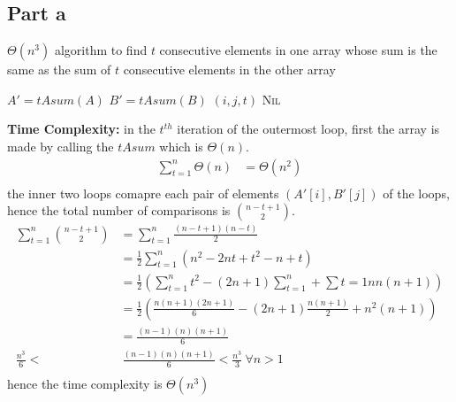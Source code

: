 \documentclass[12pt]{article}
\begin{document}
\subsection*{Part a}
\begin{algorithm}[H]
    \caption{$\varTheta(n^3)$ algorithm to find $t$ consecutive elements in one array whose sum is the same as the sum of $t$ consecutive elements in the other array}
\begin{algorithmic}[1]
            \State $A' = tAsum(A)$
            \State $B' = tAsum(B)$
        \EndFor
                    \State \Return $(i, j, t)$\;
                \EndIf
            \EndFor
        \EndFor
    \EndFor
    \State \Return \textsc{Nil}\;
\end{algorithmic}
\end{algorithm}
\textbf{Time Complexity:} in the $t^{th}$ iteration of the outermost loop, first the array is made by calling the $tAsum$ which is $\varTheta(n)$.
\begin{align*}
    \sum_{t=1}^{n}\varTheta(n) &= \varTheta(n^2)\\
\end{align*}                                                                                                                                         
the inner two loops comapre each pair of elements $(A'[i], B'[j])$ of the loops, hence the total number of comparisons is $\binom{n-t+1}{2}$.\\
\begin{align*}
    \sum_{t=1}^{n}\binom{n-t+1}{2} &= \sum_{t=1}^{n}\frac{(n-t+1)(n-t)}{2}\\
    &= \frac{1}{2}\sum_{t=1}^{n}(n^2 - 2nt + t^2 - n + t)\\
    &= \frac{1}{2}(\sum_{t=1}^{n}t^2 - (2n + 1)\sum_{t=1}^{n} + \sum{t=1}{n}n(n+1))\\
    &= \frac{1}{2}(\frac{n(n+1)(2n+1)}{6} - (2n+1)\frac{n(n+1)}{2} + n^2(n+1))\\
    &= \frac{(n-1)(n)(n+1)}{6}\\
    \frac{n^3}{6} < & ~ \frac{(n-1)(n)(n+1)}{6} < \frac{n^3}{3} ~ \forall n>1\\
\end{align*}
hence the time complexity is $\varTheta(n^3)$
\end{document}
